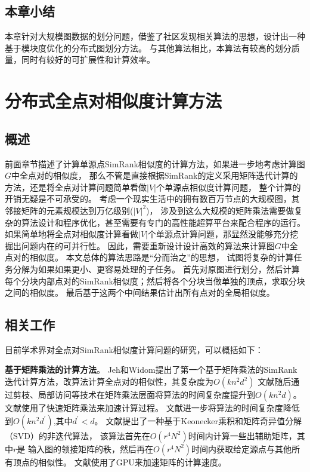 \documentclass[master]{njuthesis}
\begin{document}
\section{本章小结}
本章针对大规模图数据的划分问题，借鉴了社区发现相关算法的思想，设计出一种基于模块度优化的分布式图划分方法。
与其他算法相比，本算法有较高的划分质量，同时有较好的可扩展性和计算效率。

\chapter{分布式全点对相似度计算方法}\label{chapter_allSimRank}
\section{概述}
前面章节描述了计算单源点SimRank相似度的计算方法，如果进一步地考虑计算图$G$中全点对的相似度，
那么不管是直接根据SimRank的定义采用矩阵迭代计算的方法，还是将全点对计算问题简单看做$|V|$个单源点相似度计算问题，
整个计算的开销无疑是不可承受的。
考虑一个现实生活中的拥有数百万节点的大规模图，其邻接矩阵的元素规模达到万亿级别($|V|^2$)，
涉及到这么大规模的矩阵乘法需要做复杂的算法设计和程序优化，甚至需要有专门的高性能超算平台来配合程序的运行。
如果简单地将全点对相似度计算看做$|V|$个单源点计算问题，那显然没能够充分挖掘出问题内在的可并行性。
因此，需要重新设计设计高效的算法来计算图$G$中全点对的相似度。
本文总体的算法思路是“分而治之”的思想，
试图将复杂的计算任务分解为如果如果更小、更容易处理的子任务。
首先对原图进行划分，然后计算每个分块内部点对的SimRank相似度；然后将各个分块当做单独的顶点，求取分块之间的相似度。
最后基于这两个中间结果估计出所有点对的全局相似度。
\section{相关工作}
目前学术界对全点对SimRank相似度计算问题的研究，可以概括如下：

\textbf{基于矩阵乘法的计算方法}。 
Jeh和Widom\cite{jeh2002simrank}提出了第一个基于矩阵乘法的SimRank迭代计算方法，改算法计算全点对的相似性，其复杂度为$O(kn^2d^2)$
文献\cite{lizorkin2008accuracy}随后通过剪枝、局部访问等技术在矩阵乘法层面将算法的时间复杂度提升到$O(kn^2d)$。
文献\cite{yu2012space}使用了快速矩阵乘法来加速计算过程。
文献\cite{yu2013towards}进一步将算法的时间复杂度降低到$O(kn^2d^{\prime})$,其中$d^\prime < d$。
文献\cite{li2010fast1}提出了一种基于Keonecker乘积和矩阵奇异值分解（SVD）的非迭代算法，
该算法首先在$O(r^4N^2)$时间内计算一些出辅助矩阵，其中$r$是
输入图的领接矩阵的秩，然后再在$O(r^4N^2)$时间内获取给定源点与其他所有顶点的相似性。
文献\cite{he2010parallel}使用了GPU来加速矩阵的计算速度。
\end{document}
